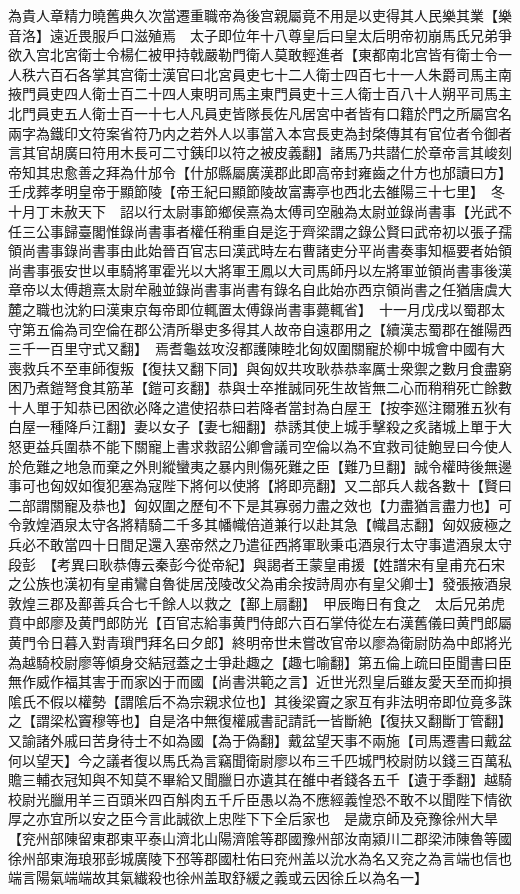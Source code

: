 為貴人章精力曉舊典久次當遷重職帝為後宫親屬竟不用是以吏得其人民樂其業【樂音洛】遠近畏服戶口滋殖焉　太子即位年十八尊皇后曰皇太后明帝初崩馬氏兄弟爭欲入宫北宮衛士令楊仁被甲持戟嚴勒門衛人莫敢輕進者【東都南北宫皆有衛士令一人秩六百石各掌其宫衛士漢官曰北宮員吏七十二人衛士四百七十一人朱爵司馬主南掖門員吏四人衛士百二十四人東明司馬主東門員吏十三人衛士百八十人朔平司馬主北門員吏五人衛士百一十七人凡員吏皆隊長佐凡居宮中者皆有口籍於門之所屬宫名兩字為鐵印文符案省符乃内之若外人以事當入本宫長吏為封棨傳其有官位者令御者言其官胡廣曰符用木長可二寸銕印以符之被皮義翻】諸馬乃共譛仁於章帝言其峻刻帝知其忠愈善之拜為什邡令【什邡縣屬廣漢郡此即高帝封雍齒之什方也邡讀曰方】　壬戌葬孝明皇帝于顯節陵【帝王紀曰顯節陵故富夀亭也西北去雒陽三十七里】　冬十月丁未赦天下　詔以行太尉事節鄉侯熹為太傅司空融為太尉並錄尚書事【光武不任三公事歸臺閣惟錄尚書事者權任稍重自是迄于齊梁謂之錄公賢曰武帝初以張子孺領尚書事錄尚書事由此始晉百官志曰漢武時左右曹諸吏分平尚書奏事知樞要者始領尚書事張安世以車騎將軍霍光以大將軍王鳳以大司馬師丹以左將軍並領尚書事後漢章帝以太傅趙熹太尉牟融並錄尚書事尚書有錄名自此始亦西京領尚書之任猶唐虞大麓之職也沈約曰漢東京每帝即位輒置太傅錄尚書事薨輒省】　十一月戊戌以蜀郡太守第五倫為司空倫在郡公清所舉吏多得其人故帝自遠郡用之【續漢志蜀郡在雒陽西三千一百里守式又翻】　焉耆龜兹攻沒都護陳睦北匈奴圍關寵於柳中城會中國有大喪救兵不至車師復叛【復扶又翻下同】與匈奴共攻耿恭恭率厲士衆禦之數月食盡窮困乃煮鎧弩食其筋革【鎧可亥翻】恭與士卒推誠同死生故皆無二心而稍稍死亡餘數十人單于知恭已困欲必降之遣使招恭曰若降者當封為白屋王【按李廵注爾雅五狄有白屋一種降戶江翻】妻以女子【妻七細翻】恭誘其使上城手擊殺之炙諸城上單于大怒更益兵圍恭不能下關寵上書求救詔公卿會議司空倫以為不宜救司徒鮑昱曰今使人於危難之地急而棄之外則縱蠻夷之暴内則傷死難之臣【難乃旦翻】誠令權時後無邊事可也匈奴如復犯塞為寇陛下將何以使將【將即亮翻】又二部兵人裁各數十【賢曰二部謂關寵及恭也】匈奴圍之歷旬不下是其寡弱力盡之效也【力盡猶言盡力也】可令敦煌酒泉太守各將精騎二千多其幡幟倍道兼行以赴其急【幟昌志翻】匈奴疲極之兵必不敢當四十日間足還入塞帝然之乃遣征西將軍耿秉屯酒泉行太守事遣酒泉太守段彭　【考異曰耿恭傳云秦彭今從帝紀】與謁者王蒙皇甫援【姓譜宋有皇甫充石宋之公族也漢初有皇甫鸞自魯徙居茂陵改父為甫余按詩周亦有皇父卿士】發張掖酒泉敦煌三郡及鄯善兵合七千餘人以救之【鄯上扇翻】　甲辰晦日有食之　太后兄弟虎賁中郎廖及黄門郎防光【百官志給事黄門侍郎六百石掌侍從左右漢舊儀曰黄門郎屬黄門令日暮入對青瑣門拜名曰夕郎】終明帝世未嘗改官帝以廖為衛尉防為中郎將光為越騎校尉廖等傾身交結冠蓋之士爭赴趣之【趣七喻翻】第五倫上疏曰臣聞書曰臣無作威作福其害于而家凶于而國【尚書洪範之言】近世光烈皇后雖友愛天至而抑損隂氏不假以權勢【謂隂后不為宗親求位也】其後梁竇之家互有非法明帝即位竟多誅之【謂梁松竇穆等也】自是洛中無復權戚書記請託一皆斷絶【復扶又翻斷丁管翻】又諭諸外戚曰苦身待士不如為國【為于偽翻】戴盆望天事不兩施【司馬遷書曰戴盆何以望天】今之議者復以馬氏為言竊聞衛尉廖以布三千匹城門校尉防以錢三百萬私贍三輔衣冠知與不知莫不畢給又聞臘日亦遺其在雒中者錢各五千【遺于季翻】越騎校尉光臘用羊三百頭米四百斛肉五千斤臣愚以為不應經義惶恐不敢不以聞陛下情欲厚之亦宜所以安之臣今言此誠欲上忠陛下下全后家也　是歲京師及兗豫徐州大旱【兖州部陳留東郡東平泰山濟北山陽濟隂等郡國豫州部汝南潁川二郡梁沛陳魯等國徐州部東海琅邪彭城廣陵下邳等郡國杜佑曰兖州盖以沇水為名又兖之為言端也信也端言陽氣端端故其氣纎殺也徐州盖取舒緩之義或云因徐丘以為名一】

